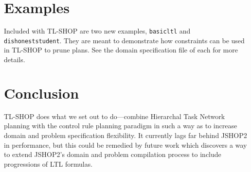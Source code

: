 \documentclass[12pt]{article}
\begin{document}
\section{Examples}
Included with TL-SHOP are two new examples, \texttt{basicltl} and 
\texttt{dishoneststudent}. They are meant to demonstrate how 
constraints can be used in TL-SHOP to prune plans. See the domain specification 
file of each for more details.

\section{Conclusion}
TL-SHOP does what we set out to do---combine Hierarchal Task Network planning 
with the control rule planning paradigm in such a way as to increase domain and 
problem specification flexibility. It currently lags far behind JSHOP2 in 
performance, but this could be remedied by future work which discovers a way to 
extend JSHOP2's domain and problem compilation process to include progressions 
of LTL formulas.



\end{document}
